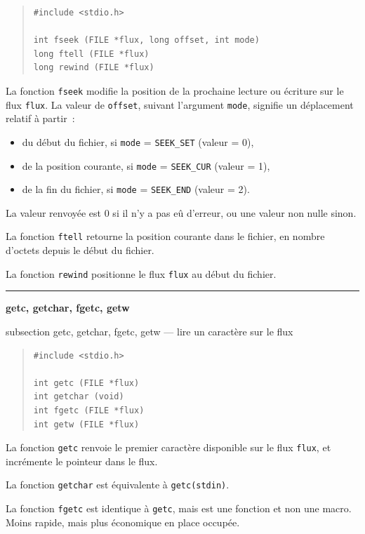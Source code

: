 \documentclass [twoside] {report}
\newcommand {\primitive} [1]
    {
	\phantomsection
	{\large \textbf {#1}}
	\addcontentsline {toc} {subsection} {#1}
    }
\newcommand {\separation}
    {
	\vspace {5mm}
	\nopagebreak
	\hrule
    }
\begin{document}
\begin {quote}
\begin {verbatim}
#include <stdio.h>

int fseek (FILE *flux, long offset, int mode)
long ftell (FILE *flux)
long rewind (FILE *flux)
\end{verbatim}
\end {quote}

La fonction \texttt {fseek} modifie la position de la prochaine
lecture ou écriture sur le flux \texttt {flux}. La valeur de
\texttt {offset}, suivant l'argument \texttt {mode}, signifie un
déplacement relatif à partir~:

\begin {itemize}
\item du début du fichier, si \texttt {mode} = \texttt {SEEK\_SET} (valeur = 0),
\item de la position courante, si \texttt {mode} = \texttt {SEEK\_CUR} (valeur = 1),
\item de la fin du fichier, si \texttt {mode} = \texttt {SEEK\_END} (valeur = 2).
\end {itemize}

La valeur renvoyée est 0 si il n'y a pas eû d'erreur, ou une valeur
non nulle sinon.

La fonction \texttt {ftell} retourne la position courante dans le
fichier, en nombre d'octets depuis le début du fichier.

La fonction \texttt {rewind} positionne le flux \texttt {flux} au début
du fichier.


\separation
\primitive {getc, getchar, fgetc, getw} --- lire un caractère sur le flux

\begin {quote}
\begin {verbatim}
#include <stdio.h>

int getc (FILE *flux)
int getchar (void)
int fgetc (FILE *flux)
int getw (FILE *flux)
\end{verbatim}
\end {quote}

La fonction \texttt {getc} renvoie le premier caractère
disponible sur le flux \texttt {flux}, et incrémente le pointeur
dans le flux.

La fonction \texttt {getchar} est équivalente à \texttt {getc(stdin)}.

La fonction \texttt {fgetc} est identique à \texttt {getc}, mais est une
fonction et non une macro. Moins rapide, mais plus
économique en place occupée.
\end{document}
